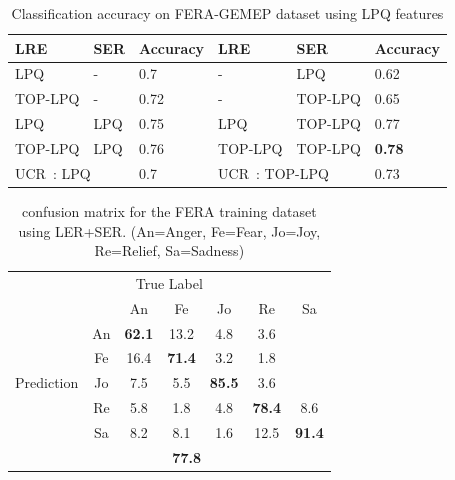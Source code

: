 \documentclass[journal]{IEEEtran}
\begin{document}
\begin{table}[!t]
\caption{Classification accuracy on FERA-GEMEP dataset using LPQ features\label{table:comp_lpq}}
\centering
\scriptsize
\begin{tabular}{lll||lll}
\toprule
LRE & SER & Accuracy	& LRE	& SER	& Accuracy \\ \midrule 
LPQ	& -		& 0.7	& - & LPQ & 0.62 \\
TOP-LPQ & - & 0.72 & - & TOP-LPQ & 0.65 \\
LPQ & LPQ & 0.75 & LPQ & TOP-LPQ & 0.77 \\
TOP-LPQ & LPQ & 0.76 & TOP-LPQ & TOP-LPQ & \textbf{0.78} \\ \midrule
\multicolumn{2}{l}{UCR~\cite{Yang_SMCB12}: LPQ} & 0.7 & \multicolumn{2}{l}{UCR~\cite{Yang_SMCB12}: TOP-LPQ} & 0.73 \\
\bottomrule

\end{tabular}
\end{table}




\begin{table}[htbp]
\caption{confusion matrix for the FERA training dataset using LER+SER.
(An=Anger, Fe=Fear, Jo=Joy, Re=Relief, Sa=Sadness)}
\begin{center}
\label{table:mat_fera}
\begin{tabular}{c|c|ccccc}
\multicolumn{7}{c}{True Label} \\ \cline{2-7}
\multirow{7}{*}{\begin{sideways}Prediction\end{sideways}} && An & Fe & Jo & Re & Sa \\ \cline{2-7}
&An				&\textbf{62.1} &13.2  &4.8  &3.6  &   \\ \cline{2-2}
&Fe       &16.4  &\textbf{71.4}  &3.2   &1.8   & \\ \cline{2-2}
&Jo       &7.5  &5.5   &\textbf{85.5} &3.6  &    \\ \cline{2-2}
&Re       &5.8   &1.8   &4.8   &\textbf{78.4} &8.6    \\ \cline{2-2}
&Sa       &8.2   &8.1   &1.6  &12.5 &\textbf{91.4}  \\ \cline{2-2}\hline
\multicolumn{2}{c|}{Average rate} &\multicolumn{5}{c}{\textbf{77.8}} \\

\end{tabular}
\end{center}
\end{table}
\end{document}
